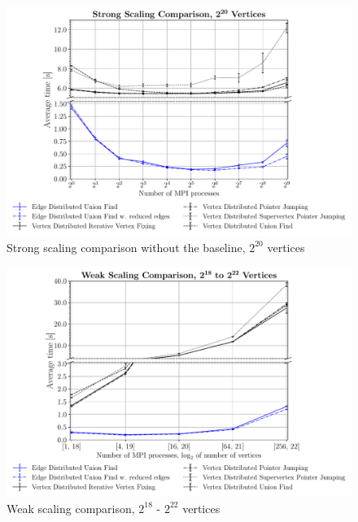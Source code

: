 \documentclass[letterpaper]{article}
\begin{document}
\begin{figure}
  \includegraphics[width=\columnwidth]{../benchmark-results/plots/strongscaling_s20.pdf}
  \caption{Strong scaling comparison without the baseline, $2^{20}$ vertices}
  \label{fig:strongscaling-20}
\end{figure}
\begin{figure}
  \includegraphics[width=\columnwidth]{../benchmark-results/plots/weakscaling.pdf}
  \caption{Weak scaling comparison, $2^{18}$ - $2^{22}$ vertices}
  \label{fig:weakscaling}
\end{figure}
\end{document}
